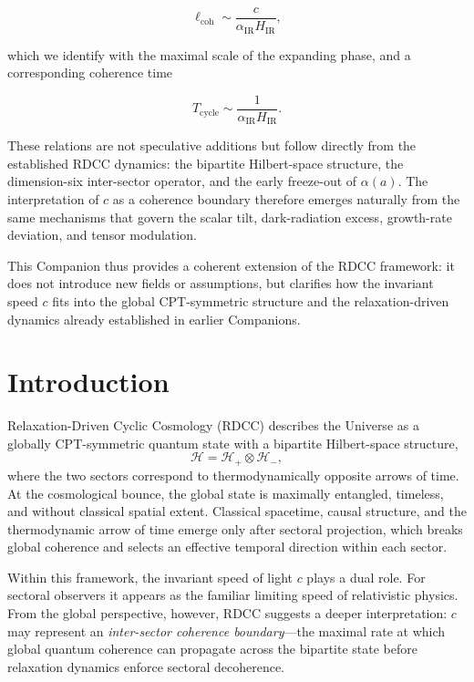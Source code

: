 \documentclass[11pt,a4paper]{article}
\begin{document}
\[
\ell_{\mathrm{coh}} \sim \frac{c}{\alpha_{\mathrm{IR}} H_{\mathrm{IR}}},
\]


which we identify with the maximal scale of the expanding phase, and a corresponding coherence time


\[
T_{\mathrm{cycle}} \sim \frac{1}{\alpha_{\mathrm{IR}} H_{\mathrm{IR}}}.
\]



These relations are not speculative additions but follow directly from the established RDCC dynamics: the bipartite Hilbert-space structure, the dimension-six inter-sector operator, and the early freeze-out of \(\alpha(a)\). The interpretation of \(c\) as a coherence boundary therefore emerges naturally from the same mechanisms that govern the scalar tilt, dark-radiation excess, growth-rate deviation, and tensor modulation.

This Companion thus provides a coherent extension of the RDCC framework: it does not introduce new fields or assumptions, but clarifies how the invariant speed \(c\) fits into the global CPT-symmetric structure and the relaxation-driven dynamics already established in earlier Companions.

\section{Introduction}

Relaxation-Driven Cyclic Cosmology (RDCC) describes the Universe as a globally
CPT-symmetric quantum state with a bipartite Hilbert-space structure,
\begin{equation}
    \mathcal{H} = \mathcal{H}_{+} \otimes \mathcal{H}_{-},
\end{equation}
where the two sectors correspond to thermodynamically opposite arrows of time.
At the cosmological bounce, the global state is maximally entangled, timeless,
and without classical spatial extent. Classical spacetime, causal structure, and
the thermodynamic arrow of time emerge only after sectoral projection, which
breaks global coherence and selects an effective temporal direction within each
sector.

Within this framework, the invariant speed of light $c$ plays a dual role. For
sectoral observers it appears as the familiar limiting speed of relativistic
physics. From the global perspective, however, RDCC suggests a deeper
interpretation: $c$ may represent an \emph{inter-sector coherence boundary}—the
maximal rate at which global quantum coherence can propagate across the
bipartite state before relaxation dynamics enforce sectoral decoherence.
\end{document}

